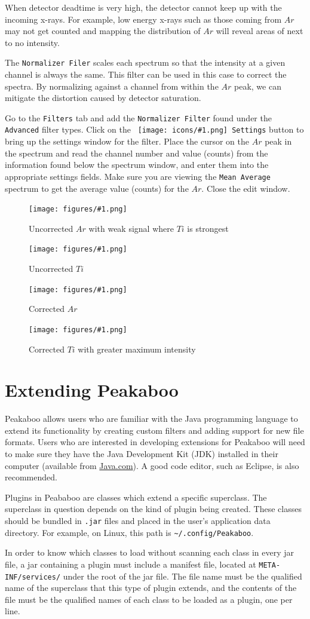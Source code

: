 \documentclass[article,twoside,11pt]{report}
\newcommand{\command}[1]{\texttt{#1}}
\newcommand{\icon}[1]{\texttt{[image: icons/\#1.png]}}
\newcommand{\button}[2]{\ \command{\icon{#1} #2}}
\newcommand{\file}[1]{\command{#1}}
\newcommand{\element}[1]{$#1$}
\newcommand{\screenshot}[2]{%
\begin{figure}[h!]
\centering\texttt{[image: figures/\#1.png]}
\caption{#2}
\end{figure}
}
\newcommand{\tocchapter}[1]{\cleardoublepage\chapter*{#1}\addcontentsline{toc}{chapter}{#1}}
\begin{document}
When detector deadtime is very high, the detector cannot keep up with the incoming x-rays.
For example, low energy x-rays such as those coming from \element{Ar} may not get counted
and mapping the distribution of \element{Ar} will reveal areas of next to no intensity. 

The \command{Normalizer Filer} scales each spectrum so that the intensity at a given channel is
always the same. This filter can be used in this case to correct the spectra. By normalizing 
against a channel from within the \element{Ar} peak, we can mitigate the distortion caused by 
detector saturation.

Go to the \command{Filters} tab and add the \command{Normalizer Filter} found under the 
\command{Advanced} filter types. Click on the \button{misc-preferences}{Settings} button 
to bring up the settings window for the filter. Place the cursor on the \element{Ar} peak in the 
spectrum and read the channel number and value (counts) from the information found 
below the spectrum window, and enter them into the appropriate settings fields. Make sure 
you are viewing the \command{Mean Average} spectrum to get the average value (counts) for 
the \element{Ar}. Close the edit window.

\clearpage
\screenshot{normalize-uncorrected-ar}{Uncorrected \element{Ar} with weak signal where \element{Ti} is strongest}
\screenshot{normalize-uncorrected-ti}{Uncorrected \element{Ti}}
\screenshot{normalize-corrected-ar}{Corrected \element{Ar}}
\screenshot{normalize-corrected-ti}{Corrected \element{Ti} with greater maximum intensity}

\tocchapter{Extending Peakaboo}

Peakaboo allows users who are familiar with the Java programming language to extend its functionality by
creating custom filters and adding support for new file formats. Users who are interested in
developing extensions for Peakaboo will need to make sure they have the Java Development Kit (JDK)
installed in their computer (available from \href{http://java.com}{Java.com}). A good code editor,
such as Eclipse, is also recommended. 

Plugins in Peababoo are classes which extend a specific superclass. The superclass in question 
depends on the kind of plugin being created. These classes should be bundled in \file{.jar} files
and placed in the user's application data directory. For example, on Linux, this path is 
\file{\textasciitilde/.config/Peakaboo}.

In order to know which classes to load without scanning each class in every jar file, a jar 
containing a plugin must include a manifest file, located at \file{META-INF/services/} under
the root of the jar file. The file name must be the qualified name of the superclass that this type
of plugin extends, and the contents of the file must be the qualified names of each class to be 
loaded as a plugin, one per line.
\end{document}
